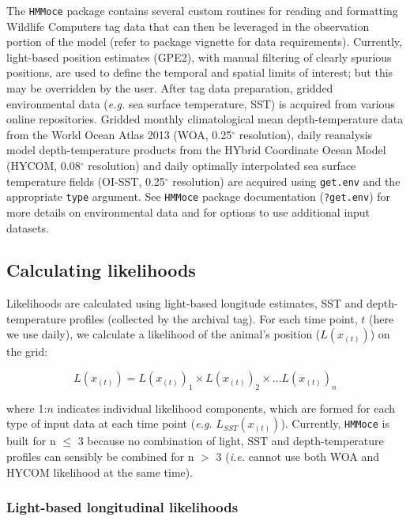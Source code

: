 The \texttt{HMMoce} package contains several custom routines for reading
and formatting Wildlife Computers tag data that can then be leveraged in
the observation portion of the model (refer to package vignette for data
requirements). Currently, light-based position estimates (GPE2), with
manual filtering of clearly spurious positions, are used to define the
temporal and spatial limits of interest; but this may be overridden by
the user. After tag data preparation, gridded environmental data
(\emph{e.g.} sea surface temperature, SST) is acquired from various
online repositories. Gridded monthly climatological mean
depth-temperature data from the World Ocean Atlas 2013 (WOA, 0.25$^{\circ}$
resolution), daily reanalysis model depth-temperature products from the
HYbrid Coordinate Ocean Model (HYCOM, 0.08$^{\circ}$ resolution) and daily
optimally interpolated sea surface temperature fields (OI-SST, 0.25$^{\circ}$
resolution) are acquired using \texttt{get.env} and the appropriate
\texttt{type} argument. See \texttt{HMMoce} package documentation
(\texttt{?get.env}) for more details on environmental data and for
options to use additional input datasets.

\subsection*{Calculating likelihoods}%

Likelihoods are calculated using light-based longitude estimates, SST
and depth-temperature profiles (collected by the archival tag). For each
time point, $t$ (here we use daily), we calculate a likelihood of the
animal's position ($L(x_{(t)})$) on the grid:

\begin{equation}
L(x_{(t)}) = L(x_{(t)})_1 \times L(x_{(t)})_2 \times ... L(x_{(t)})_n
\label{eq:a1e1}
\end{equation}

where 1:$n$ indicates individual likelihood components, which are
formed for each type of input data at each time point (\textit{e.g.}
$L_{SST}(x_{(t)})$). Currently, \texttt{HMMoce} is built for n
$\leq$ 3 because no combination of light, SST and depth-temperature
profiles can sensibly be combined for n $>$ 3 (\emph{i.e.} cannot use both
WOA and HYCOM likelihood at the same time).

\subsubsection*{Light-based longitudinal
likelihoods}%

